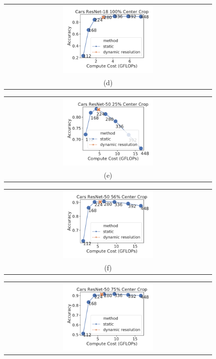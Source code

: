 \begin{figure}[t]
\begin{tabular}{@{}c@{}}
    \includegraphics[width=0.45\textwidth]{e2e_figures/cars_resnet18_full_center.pdf} \\
    \small (d)
    \end{tabular}
    \begin{tabular}{@{}c@{}}
    \includegraphics[width=0.45\textwidth]{e2e_figures/cars_resnet50_25_center.pdf} \\
    \small (e)
    \end{tabular}
    \begin{tabular}{@{}c@{}}
    \includegraphics[width=0.45\textwidth]{e2e_figures/cars_resnet50_56_center.pdf} \\
    \small (f)
    \end{tabular}
    \begin{tabular}{@{}c@{}}
    \includegraphics[width=0.45\textwidth]{e2e_figures/cars_resnet50_default_center.pdf} \\

\end{tabular}
\end{figure}
